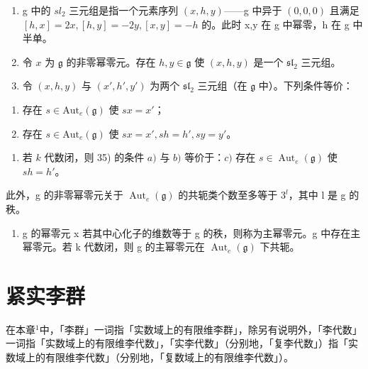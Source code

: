 \begin{enumerate}
\def\labelenumi{\arabic{enumi})}
\setcounter{enumi}{32}
\item
  g 中的 \(sl_{2}\) 三元组是指一个元素序列 \((x,h,y)\)——g 中异于 \((0,0,0)\) 且满足 \([h,x]=2x,[h,y]=-2y,[x,y]=-h\) 的。此时 x,y 在 g 中幂零，h 在 g 中半单。
\item
  令 \(x\) 为 \(\mathfrak{g}\) 的非零幂零元。存在 \(h, y \in \mathfrak{g}\) 使 \((x, h, y)\) 是一个 \(\mathfrak{sl}_2\) 三元组。
\item
  令 \((x,h,y)\) 与 \((x',h',y')\) 为两个 \(\mathfrak{sl}_2\) 三元组（在 \(\mathfrak{g}\) 中）。下列条件等价：
\end{enumerate}

\begin{enumerate}
\def\labelenumi{\alph{enumi})}
\item
  存在 \(s \in \text{Aut}_{e}(\mathfrak{g})\) 使 \(sx = x'\)；
\item
  存在 \(s \in \mathrm{Aut}_e(\mathfrak{g})\) 使 \(sx = x', sh = h', sy = y'\)。
\end{enumerate}

\begin{enumerate}
\def\labelenumi{\arabic{enumi})}
\setcounter{enumi}{35}
\tightlist
\item
  若 \(k\) 代数闭，则 35) 的条件 \(a)\) 与 \(b)\) 等价于：\(c)\) 存在 \(s \in \operatorname{Aut}_e(\mathfrak{g})\) 使 \(sh = h'\)。
\end{enumerate}

此外，g 的非零幂零元关于 \(\operatorname{Aut}_{e}(\mathfrak{g})\) 的共轭类个数至多等于 \(3^{l}\)，其中 l 是 g 的秩。

\begin{enumerate}
\def\labelenumi{\arabic{enumi})}
\setcounter{enumi}{36}
\tightlist
\item
  g 的幂零元 x 若其中心化子的维数等于 g 的秩，则称为主幂零元。g 中存在主幂零元。若 k 代数闭，则 g 的主幂零元在 \(\operatorname{Aut}_{e}(\mathfrak{g})\) 下共轭。
\end{enumerate}

\chapter{紧实李群}

在本章\(^{1}\)中，「李群」一词指「实数域上的有限维李群」，除另有说明外，「李代数」一词指「实数域上的有限维李代数」，「实李代数」（分别地，「复李代数」）指「实数域上的有限维李代数」（分别地，「复数域上的有限维李代数」）。

